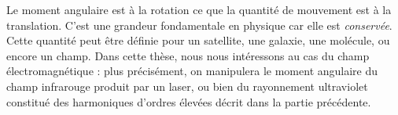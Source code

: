 Le moment angulaire est à la rotation ce que la quantité de mouvement est à la translation. C'est une grandeur fondamentale en physique car elle est \textit{conservée}. Cette quantité peut être définie pour un satellite, une galaxie, une molécule, ou encore un champ. Dans cette thèse, nous nous intéressons au cas du champ électromagnétique : plus précisément, on manipulera le moment angulaire du champ infrarouge produit par un laser, ou bien du rayonnement ultraviolet constitué des harmoniques d'ordres élevées décrit dans la partie précédente.\par




